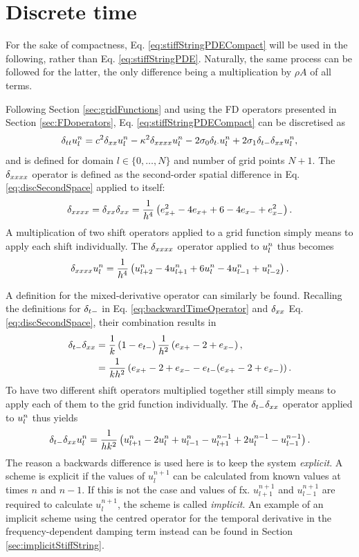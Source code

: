 \section{Discrete time}\label{sec:stiffStringDiscrete}
For the sake of compactness, Eq. \eqref{eq:stiffStringPDECompact} will be used in the following, rather than Eq. \eqref{eq:stiffStringPDE}. Naturally, the same process can be followed for the latter, the only difference being a multiplication by $\rho A$ of all terms.

Following Section \ref{sec:gridFunctions} and using the FD operators presented in Section \ref{sec:FDoperators}, Eq. \eqref{eq:stiffStringPDECompact} can be discretised as 
\begin{equation}\label{eq:stiffStringFDS}
    \delta_{tt} u_l^n = c^2 \delta_{xx} u_l^n - \kappa^2 \delta_{xxxx} u_l^n - 2 \sigma_{0} \delta_{t\cdot} u_l^n + 2 \sigma_{1}\delta_{t-}\delta_{xx} u_l^n,
\end{equation}
and is defined for domain $l\in\{0, \hdots, N\}$ and number of grid points $N+1$. 
The $\delta_{xxxx}$ operator is defined as the second-order spatial difference in Eq. \eqref{eq:discSecondSpace} applied to itself:
\begin{equation}\label{eq:dxxxx}
    \delta_{xxxx} = \delta_{xx}\delta_{xx} = \frac{1}{h^4}\left(e_{x+}^2 - 4e_{x+}+6 - 4e_{x-}+e_{x-}^2\right).
\end{equation} 
A multiplication of two shift operators applied to a grid function simply means to apply each shift individually. The $\delta_{xxxx}$ operator applied to $u_l^n$ thus becomes
\begin{equation}
    \delta_{xxxx}u_l^n = \frac{1}{h^4}\left(u_{l+2}^n - 4u_{l+1}^n+6u_l^n - 4u_{l-1}^n+u_{l-2}^n\right).
\end{equation}

A definition for the mixed-derivative operator can similarly be found.
Recalling the definitions for $\delta_{t-}$ in Eq. \eqref{eq:backwardTimeOperator} and $\delta_{xx}$ Eq. \eqref{eq:discSecondSpace}, their combination results in
\begin{align}
    \delta_{t-}\delta_{xx} &= \frac{1}{k}\left(1-e_{t-}\right)\frac{1}{h^2}\left(e_{x+}-2+e_{x-}\right),\nonumber \\
    &= \frac{1}{kh^2}\left(e_{x+}-2+e_{x-} - e_{t-}(e_{x+}-2+e_{x-})\right).
\end{align}
To have two different shift operators multiplied together still simply means to apply each of them to the grid function individually. The $\delta_{t-}\delta_{xx}$ operator applied to $u_l^n$ thus yields
\begin{equation}
    \delta_{t-} \delta_{xx} u_l^n = \frac{1}{hk^2}\left(u_{l+1}^n - 2 u_l^n + u_{l-1}^n - u_{l+1}^{n-1} + 2 u_l^{n-1} - u_{l-1}^{n-1}\right).
\end{equation}
The reason a backwards difference is used here is to keep the system \textit{explicit}. A scheme is explicit if the values of $u_l^{n+1}$ can be calculated from known values at times $n$ and $n-1$. If this is not the case and values of fx. $u_{l+1}^{n+1}$ and $u_{l-1}^{n+1}$ are required to calculate $u_l^{n+1}$, the scheme is called \textit{implicit}. An example of an implicit scheme using the centred operator for the temporal derivative in the frequency-dependent damping term instead can be found in Section \ref{sec:implicitStiffString}.

